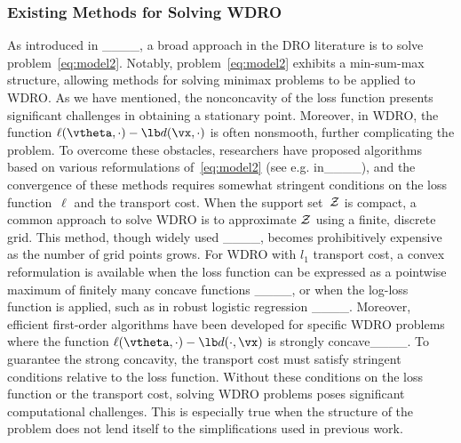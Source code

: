 	\subsubsection{Existing Methods for Solving WDRO}
	As introduced in ____, a broad approach in the DRO literature is to solve problem~\eqref{eq:model2}. Notably, problem~\eqref{eq:model2} exhibits a min-sum-max structure, allowing methods for solving minimax problems to be applied to WDRO.
	As we have mentioned, the nonconcavity of the loss function presents significant challenges in obtaining a stationary point. Moreover, in WDRO, the function $\ell(\vtheta,\cdot) - \lb d(\vx,\cdot)$ is often nonsmooth, further complicating the problem. To overcome these obstacles, researchers have proposed algorithms based on various reformulations of~\eqref{eq:model2} (see e.g. in____),  and the convergence of these methods requires somewhat stringent conditions on the loss function~$\ell$ and the transport cost.
	When the %
	{support} set~$\cal{Z}$
	is compact, a common approach to solve WDRO is to approximate $\cal{Z}$ using a finite, discrete grid. This method, though widely used ____, becomes prohibitively expensive as the number of grid points grows. For WDRO with $l_1$ transport cost, a convex reformulation is available when the loss function can be expressed as a pointwise maximum of finitely many concave functions ____, or when the log-loss function is applied, such as in robust logistic regression ____. Moreover, efficient first-order algorithms have been developed for specific WDRO problems where the function $\ell(\vtheta,\cdot)-\lb d(\cdot,\vx)$ is strongly concave____.  To guarantee the strong concavity, the transport cost must satisfy stringent conditions relative to the loss function. %
	Without these conditions on the loss function or the transport cost, solving WDRO problems poses significant computational challenges. This is especially true when the structure of the problem does not lend itself to the simplifications used in previous work. 
	
